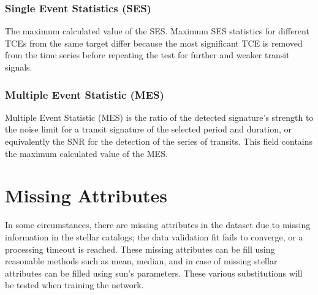 \subsubsection{Single Event Statistics (SES)}
The maximum calculated value of the SES. Maximum SES statistics for different TCEs from the same target differ because the most significant TCE is removed from the time series before repeating the test for further and weaker transit signals. 

\subsubsection{Multiple Event Statistic (MES)}
Multiple Event Statistic (MES) is the ratio of the detected signature's strength to the noise limit for a transit signature of the selected period and duration, or equivalently the SNR for the detection of the series of transits. This field contains the maximum calculated value of the MES.


\section{Missing Attributes}
In some circumstances, there are missing attributes in the dataset due to missing information in the stellar catalogs; the data validation fit fails to converge, or a processing timeout is reached. These missing attributes can be fill using reasonable methods such as mean, median, and in case of missing stellar attributes can be filled using sun's parameters. These various substitutions will be tested when training the network.




